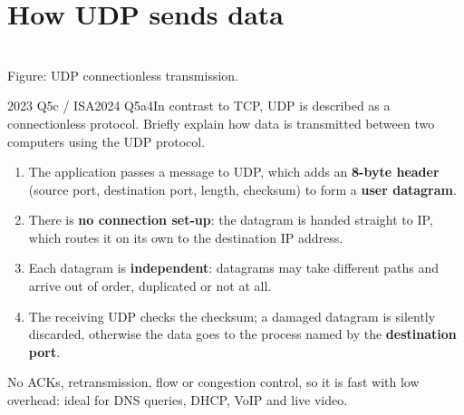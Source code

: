 \documentclass[10pt]{article}
\begin{document}
\section{How UDP sends data}

\begin{center}
\\
{\scriptsize\color{midgrey}Figure: UDP connectionless transmission.}
\end{center}

\begin{pastq}{2023 Q5c \textnormal{/} ISA2024 Q5a}{4}In contrast to TCP, UDP is described as a connectionless protocol. Briefly explain how data is transmitted between two computers using the UDP protocol.\end{pastq}
\begin{ans}
\begin{enumerate}
\item The application passes a message to UDP, which adds an \textbf{8-byte header} (source port, destination port, length, checksum) to form a \textbf{user datagram}.
\item There is \textbf{no connection set-up}: the datagram is handed straight to IP, which routes it on its own to the destination IP address.
\item Each datagram is \textbf{independent}: datagrams may take different paths and arrive out of order, duplicated or not at all.
\item The receiving UDP checks the checksum; a damaged datagram is silently discarded, otherwise the data goes to the process named by the \textbf{destination port}.
\end{enumerate}
No ACKs, retransmission, flow or congestion control, so it is fast with low overhead: ideal for DNS queries, DHCP, VoIP and live video.
\end{ans}
\end{document}
